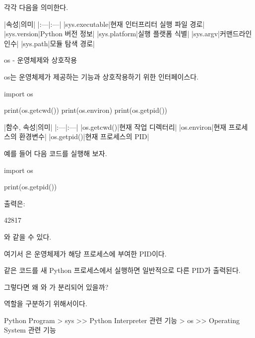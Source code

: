 각각 다음을 의미한다.

\begin{dhktable}
|속성|의미|
|:---|:---|
|sys.executable|현재 인터프리터 실행 파일 경로|
|sys.version|Python 버전 정보|
|sys.platform|실행 플랫폼 식별|
|sys.argv|커맨드라인 인수|
|sys.path|모듈 탐색 경로|
\end{dhktable}

\begin{dhknote}
\begin{dhksmry}[centered]
os - 운영체제와 상호작용
\end{dhksmry}

\begin{dhksmry}
os는 운영체제가 제공하는 기능과 상호작용하기 위한 인터페이스다.
\end{dhksmry}
\end{dhknote}

\begin{dhkcode}
import os

print(os.getcwd())
print(os.environ)
print(os.getpid())
\end{dhkcode}

\begin{dhktable}
|함수, 속성|의미|
|:---|:---|
|os.getcwd()|현재 작업 디렉터리|
|os.environ|현재 프로세스의 환경변수|
|os.getpid()|현재 프로세스의 PID|
\end{dhktable}

예를 들어 다음 코드를 실행해 보자.

\begin{dhkcode}
import os

print(os.getpid())
\end{dhkcode}

출력은:

\begin{dhkzsh}
42817
\end{dhkzsh}

와 같을 수 있다.

여기서 은 운영체제가 해당 프로세스에 부여한 PID이다.

같은 코드를 새 Python 프로세스에서 실행하면 일반적으로 다른 PID가 출력된다.

그렇다면 왜 와 가 분리되어 있을까?

역할을 구분하기 위해서이다.

\begin{dhkdir}
Python Program
> sys
>> Python Interpreter 관련 기능
> os
>> Operating System 관련 기능
\end{dhkdir}

